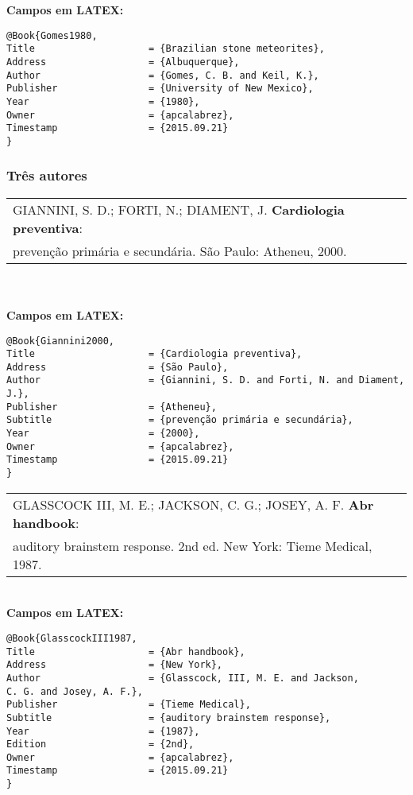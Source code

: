 \textbf{Campos em LATEX:}

\begin{verbatim}
@Book{Gomes1980,
Title                    = {Brazilian stone meteorites},
Address                  = {Albuquerque},
Author                   = {Gomes, C. B. and Keil, K.},
Publisher                = {University of New Mexico},
Year                     = {1980},
Owner                    = {apcalabrez},
Timestamp                = {2015.09.21}
}
\end{verbatim}

\subsubsection{Três autores}

\begin{tabular}{|l|c|} \hline
GIANNINI, S. D.; FORTI, N.; DIAMENT, J. \textbf{Cardiologia preventiva}:\\ prevenção primária e secundária. São Paulo: Atheneu, 2000. \\\hline
\end{tabular}\\
\\
\textbf{Campos em LATEX:}

\begin{verbatim}
@Book{Giannini2000,
Title                    = {Cardiologia preventiva},
Address                  = {São Paulo},
Author                   = {Giannini, S. D. and Forti, N. and Diament, 
J.},
Publisher                = {Atheneu},
Subtitle                 = {prevenção primária e secundária},
Year                     = {2000},
Owner                    = {apcalabrez},
Timestamp                = {2015.09.21}
}

\end{verbatim}

\begin{tabular}{|l|c|} \hline
GLASSCOCK III, M. E.; JACKSON, C. G.; JOSEY, A. F. \textbf{Abr handbook}: \\ auditory brainstem response. 2nd ed. New York: Tieme Medical, 1987. \\\hline
\end{tabular}\\

\textbf{Campos em LATEX:}

\begin{verbatim}
@Book{GlasscockIII1987,
Title                    = {Abr handbook},
Address                  = {New York},
Author                   = {Glasscock, III, M. E. and Jackson, 
C. G. and Josey, A. F.},
Publisher                = {Tieme Medical},
Subtitle                 = {auditory brainstem response},
Year                     = {1987},
Edition                  = {2nd},
Owner                    = {apcalabrez},
Timestamp                = {2015.09.21}
}
\end{verbatim}

